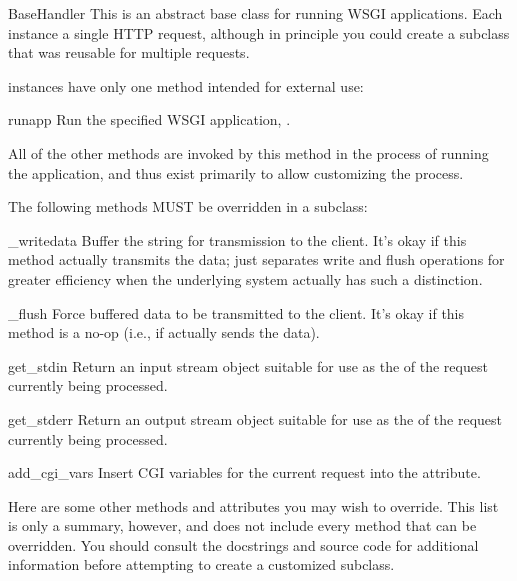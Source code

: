 \begin{classdesc}{BaseHandler}{}
This is an abstract base class for running WSGI applications.  Each
instance a single HTTP request, although in principle you could create
a subclass that was reusable for multiple requests.

 instances have only one method intended for external
use:

\begin{methoddesc}{run}{app}
Run the specified WSGI application, .
\end{methoddesc}

All of the other  methods are invoked by this method
in the process of running the application, and thus exist primarily to
allow customizing the process.

The following methods MUST be overridden in a subclass:

\begin{methoddesc}{_write}{data}
Buffer the string  for transmission to the client.  It's okay
if this method actually transmits the data; 
just separates write and flush operations for greater efficiency
when the underlying system actually has such a distinction.
\end{methoddesc}

\begin{methoddesc}{_flush}{}
Force buffered data to be transmitted to the client.  It's okay if this
method is a no-op (i.e., if  actually sends the data).
\end{methoddesc}

\begin{methoddesc}{get_stdin}{}
Return an input stream object suitable for use as the 
of the request currently being processed.
\end{methoddesc}

\begin{methoddesc}{get_stderr}{}
Return an output stream object suitable for use as the
 of the request currently being processed.
\end{methoddesc}

\begin{methoddesc}{add_cgi_vars}{}
Insert CGI variables for the current request into the 
attribute.
\end{methoddesc}

Here are some other methods and attributes you may wish to override.
This list is only a summary, however, and does not include every method
that can be overridden.  You should consult the docstrings and source
code for additional information before attempting to create a customized
 subclass.

















\end{classdesc}
